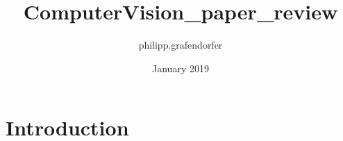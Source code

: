 \documentclass{article}
\title{ComputerVision_paper_review}
\author{philipp.grafendorfer }
\date{January 2019}
\begin{document}
\maketitle

\section{Introduction}
\end{document}

